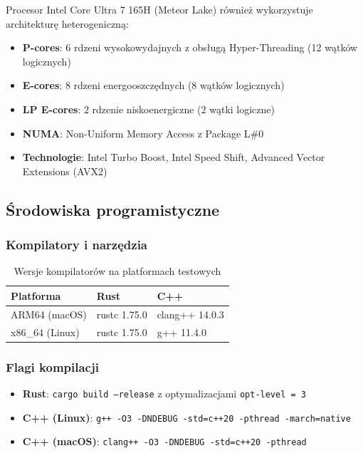 Procesor Intel Core Ultra 7 165H (Meteor Lake) również wykorzystuje architekturę heterogeniczną:
\begin{itemize}
    \item \textbf{P-cores}: 6 rdzeni wysokowydajnych z obsługą Hyper-Threading (12 wątków logicznych)
    \item \textbf{E-cores}: 8 rdzeni energooszczędnych (8 wątków logicznych)
    \item \textbf{LP E-cores}: 2 rdzenie niskoenergiczne (2 wątki logiczne)
    \item \textbf{NUMA}: Non-Uniform Memory Access z Package L\#0
    \item \textbf{Technologie}: Intel Turbo Boost, Intel Speed Shift, Advanced Vector Extensions (AVX2)
\end{itemize}

\subsection{Środowiska programistyczne}

\subsubsection{Kompilatory i narzędzia}

\begin{table}[h]
\centering
\caption{Wersje kompilatorów na platformach testowych}
\begin{tabular}{|l|l|l|}
\hline
\textbf{Platforma} & \textbf{Rust} & \textbf{C++} \\
\hline
ARM64 (macOS) & rustc 1.75.0 & clang++ 14.0.3 \\
x86\_64 (Linux) & rustc 1.75.0 & g++ 11.4.0 \\
\hline
\end{tabular}

\label{tab:compilers}
\end{table}

\subsubsection{Flagi kompilacji}
\begin{itemize}
    \item \textbf{Rust}: \texttt{cargo build --release} z optymalizacjami \texttt{opt-level = 3}
    \item \textbf{C++ (Linux)}: \texttt{g++ -O3 -DNDEBUG -std=c++20 -pthread -march=native}
    \item \textbf{C++ (macOS)}: \texttt{clang++ -O3 -DNDEBUG -std=c++20 -pthread}
\end{itemize}
